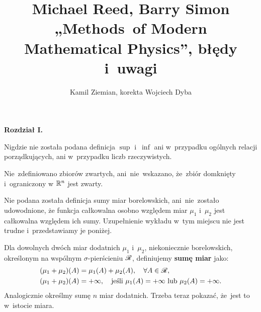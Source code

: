\documentclass[a4paper,11pt]{article}
\title{ %
  Michael Reed, Barry Simon \\
  „Methods~of Modern Mathematical Physics”, błędy i~uwagi}
\author{Kamil Ziemian, korekta Wojciech Dyba}
\begin{document}





\maketitle %









\noindent
\textbf{Rozdział I.}

\vspace{\spaceFour}



\start Nigdzie nie została podana definicja $\sup$ i~$\inf$ ani
w~przypadku ogólnych relacji porządkujących, ani w~przypadku liczb
rzeczywistych. %

\vspace{\spaceFour}



\start Nie~zdefiniowano zbiorów zwartych, ani~nie~wskazano, że~zbiór
domknięty i~ograniczony w $\mathbb{R}^{ n }$ jest zwarty.

\vspace{\spaceFour}



\start Nie podana została definicja sumy miar borelowskich,
ani~nie~zostało udowodnione, że funkcja całkowalna osobno względem
miar $\mu_{ 1 }$ i~$\mu_{ 2 }$ jest całkowalna względem ich sumy.
Uzupełnienie wykładu w~tym miejscu nie jest trudne i~przedstawiamy je
poniżej.

Dla dowolnych dwóch miar dodatnich $\mu_{ 1 }$ i~$\mu_{ 2 }$,
niekoniecznie borelowskich, określonym na wspólnym $\sigma$-pierścieniu $\mathcal{R}$, definiujemy \textbf{sumę miar} jako:
\begin{equation}
  \label{eq:RS-VolI-s0-01}
  \begin{split}
    ( \mu_{ 1 } + \mu_{ 2 } )( A )
    &=
      \mu_{ 1 }( A ) + \mu_{ 2 }( A ), \quad
      \forall A \in \mathcal{R}, \\
    ( \mu_{ 1 } + \mu_{ 2 } )( A )
    &=
      +\infty, \quad \textrm{jeśli } \mu_{ 1 }( A ) = +\infty \textrm{ lub }
      \mu_{ 2 }( A ) = +\infty.
  \end{split}
\end{equation}
Analogicznie określmy sumę $n$ miar dodatnich. Trzeba teraz pokazać,
że~jest to w~istocie miara.
\end{document}
